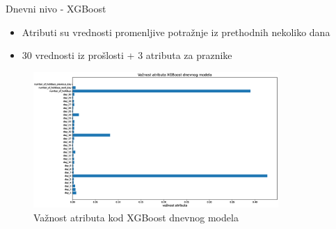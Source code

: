 \documentclass{beamer}
\begin{document}
\begin{frame}{Dnevni nivo - XGBoost}
\begin{itemize}
    \item \footnotesize{Atributi su vrednosti promenljive potražnje iz prethodnih nekoliko dana}
    \item \footnotesize{30 vrednosti iz prošlosti + 3 atributa za praznike}
\end{itemize}

\begin{figure}[!ht]
  \centering
  \includegraphics[width=0.83\textwidth]{./images/grafici/vaznost_atributa.eps}
  \vspace{-6px}
  \caption{\footnotesize{Važnost atributa kod XGBoost dnevnog modela}}
  \label{fig: vaznost_atributa}
\end{figure}

\end{frame}
\end{document}
